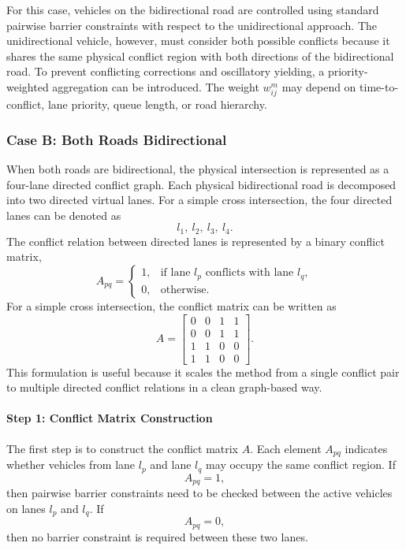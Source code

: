 \documentclass[conference]{IEEEtran}
\begin{document}
For this case, vehicles on the bidirectional road are controlled using standard pairwise barrier constraints with respect to the unidirectional approach. The unidirectional vehicle, however, must consider both possible conflicts because it shares the same physical conflict region with both directions of the bidirectional road. To prevent conflicting corrections and oscillatory yielding, a priority-weighted aggregation can be introduced. The weight $w_{ij}^m$ may depend on time-to-conflict, lane priority, queue length, or road hierarchy.

\subsubsection{Case B: Both Roads Bidirectional}
When both roads are bidirectional, the physical intersection is represented as a four-lane directed conflict graph. Each physical bidirectional road is decomposed into two directed virtual lanes. For a simple cross intersection, the four directed lanes can be denoted as
\begin{equation}
l_1,\ l_2,\ l_3,\ l_4.
\end{equation}
The conflict relation between directed lanes is represented by a binary conflict matrix,
\begin{equation}
A_{pq}
=
\begin{cases}
1, & \text{if lane } l_p \text{ conflicts with lane } l_q,\\
0, & \text{otherwise}.
\end{cases}
\end{equation}
For a simple cross intersection, the conflict matrix can be written as
\begin{equation}
A=
\begin{bmatrix}
0 & 0 & 1 & 1\\
0 & 0 & 1 & 1\\
1 & 1 & 0 & 0\\
1 & 1 & 0 & 0
\end{bmatrix}.
\end{equation}
This formulation is useful because it scales the method from a single conflict pair to multiple directed conflict relations in a clean graph-based way.

\paragraph{Step 1: Conflict Matrix Construction}
The first step is to construct the conflict matrix $A$. Each element $A_{pq}$ indicates whether vehicles from lane $l_p$ and lane $l_q$ may occupy the same conflict region. If
\begin{equation}
A_{pq}=1,
\end{equation}
then pairwise barrier constraints need to be checked between the active vehicles on lanes $l_p$ and $l_q$. If
\begin{equation}
A_{pq}=0,
\end{equation}
then no barrier constraint is required between these two lanes.
\end{document}
